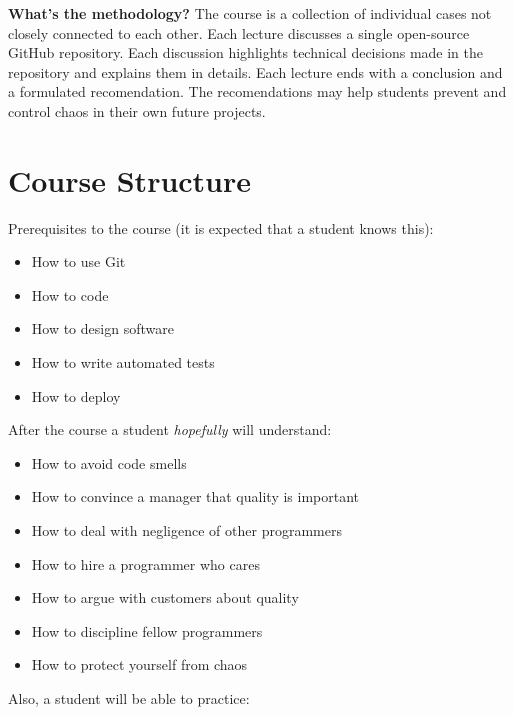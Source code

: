 \documentclass[nobrand,anonymous,nodate,nosecurity]{huawei}
\begin{document}
{\textbf{What's the methodology?}
The course is a collection of individual cases not
closely connected to each other. Each lecture discusses a single open-source
GitHub repository. Each discussion highlights technical decisions made in the
repository and explains them in details. Each lecture ends with a conclusion
and a formulated recomendation. The recomendations may help students
prevent and control chaos in their own future projects.

\newpage
\section*{Course Structure}

Prerequisites to the course (it is expected that a student knows this):

\begin{itemize}
\item How to use Git
\item How to code
\item How to design software
\item How to write automated tests
\item How to deploy
\end{itemize}

After the course a student \emph{hopefully} will understand:

\begin{itemize}
\item How to avoid code smells
\item How to convince a manager that quality is important
\item How to deal with negligence of other programmers
\item How to hire a programmer who cares
\item How to argue with customers about quality
\item How to discipline fellow programmers
\item How to protect yourself from chaos
\end{itemize}

Also, a student will be able to practice:

}
\end{document}
